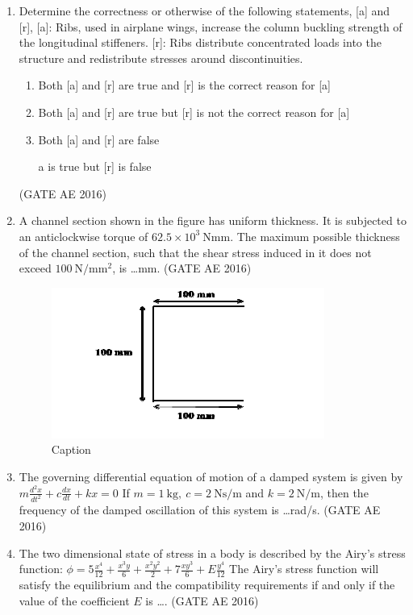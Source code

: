 \documentclass[journal,12pt,onecolumn]{IEEEtran}
\theoremstyle{remark}
\begin{document}
\begin{enumerate}
\item Determine the correctness or otherwise of the following statements, [a] and [r],
[a]: Ribs, used in airplane wings, increase the column buckling strength of the longitudinal stiffeners.
[r]: Ribs distribute concentrated loads into the structure and redistribute stresses around discontinuities.
\begin{enumerate}
    \item Both [a] and [r] are true and [r] is the correct reason for [a]
    \item Both [a] and [r] are true but [r] is not the correct reason for [a]
    \item Both [a] and [r] are false
    \item [a] is true but [r] is false
\end{enumerate}
\hfill(GATE AE 2016)



\item A channel section shown in the figure has uniform thickness. It is subjected to an anticlockwise torque of $62.5\times10^3~\mathrm{Nmm}$. The maximum possible thickness of the channel section, such that the shear stress induced in it does not exceed $100~\mathrm{N/mm^2}$, is \dots mm.
\hfill(GATE AE 2016)

\begin{figure}[H]
    \centering
    \includegraphics[width=0.5\columnwidth]{figs/Screenshot from 2025-08-16 11-47-37.png}
    \caption{Caption}
    \label{fig:placeholder}
\end{figure}



\item The governing differential equation of motion of a damped system is given by
$
m\frac{d^2 x}{dt^2} + c\frac{dx}{dt} + kx = 0
$
If $m = 1~\mathrm{kg},~c = 2~\mathrm{Ns/m}$ and $k = 2~\mathrm{N/m}$, then the frequency of the damped oscillation of this system is \dots rad/s.
\hfill(GATE AE 2016)



\item The two dimensional state of stress in a body is described by the Airy's stress function:
$
\phi = 5\frac{x^4}{12} + \frac{x^3y}{6} + \frac{x^2y^2}{2} + 7\frac{xy^3}{6} + E\frac{y^4}{12}
$
The Airy's stress function will satisfy the equilibrium and the compatibility requirements if and only if the value of the coefficient $E$ is \dots.
\hfill(GATE AE 2016)




\end{enumerate}
\end{document}
